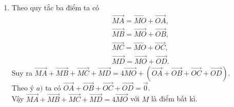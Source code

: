 \begin{vd}
{\begin{enumerate}
{\begin{tikzpicture}[scale=1, font=\footnotesize, line join=round, line cap=round, >=stealth]
				      \end{tikzpicture}}
			\item Theo quy tắc ba điểm ta có
			      \allowdisplaybreaks
			      \begin{eqnarray*}
				      && \overrightarrow{MA}= \overrightarrow {MO}  +  \overrightarrow{OA}, \\
				      && \overrightarrow{MB}= \overrightarrow {MO}  +  \overrightarrow{OB}, \\
				      && \overrightarrow{MC}= \overrightarrow {MO}  +  \overrightarrow{OC}, \\
				      && \overrightarrow{MD}= \overrightarrow {MO}  +  \overrightarrow{OD}.
			      \end{eqnarray*}
			      Suy ra $ \overrightarrow {MA}  +  \overrightarrow{MB}  +  \overrightarrow{MC}  +  \overrightarrow{MD}=4 \overrightarrow {MO}  +  \left( \overrightarrow {OA}  +  \overrightarrow{OB}  +  \overrightarrow{OC}  +  \overrightarrow{OD}\right)$. \\
			      Theo ý $a)$ ta có $ \overrightarrow {OA}  +  \overrightarrow{OB}  +  \overrightarrow{OC}  +  \overrightarrow{OD}= \overrightarrow {0}$.\\
			      Vậy $ \overrightarrow {MA}  +  \overrightarrow{MB}  +  \overrightarrow{MC}  +  \overrightarrow{MD}=4 \overrightarrow {MO}$ với $M$ là điểm bất kì.
		\end{enumerate}
	}
\end{vd}
